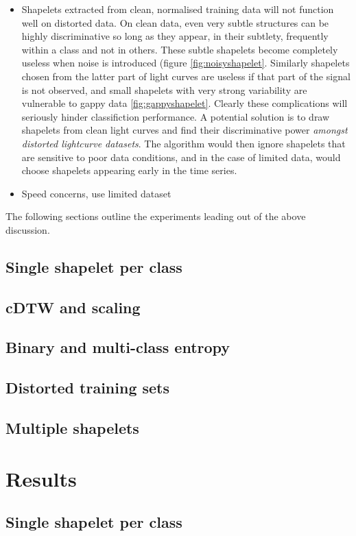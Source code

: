 \begin{itemize}
	\item Shapelets extracted from clean, normalised training data will not function well on distorted data. On clean data, even very subtle structures can be highly discriminative so long as they appear, in their subtlety, frequently within a class and not in others. These subtle shapelets become completely useless when noise is introduced (figure \ref{fig:noisyshapelet}. Similarly shapelets chosen from the latter part of light curves are useless if that part of the signal is not observed, and small shapelets with very strong variability are vulnerable to gappy data \ref{fig:gappyshapelet}. Clearly these complications will seriously hinder classifiction performance. A potential solution is to draw shapelets from clean light curves and find their discriminative power \emph{amongst distorted lightcurve datasets}. The algorithm would then ignore shapelets that are sensitive to poor data conditions, and in the case of limited data, would choose shapelets appearing early in the time series.
	\item Speed concerns, use limited dataset %
\end{itemize}

The following sections outline the experiments leading out of the above discussion.

\subsection{Single shapelet per class}
\subsection{cDTW and scaling}
\subsection{Binary and multi-class entropy}
\subsection{Distorted training sets}
\subsection{Multiple shapelets}

\section{Results}
\subsection{Single shapelet per class}
